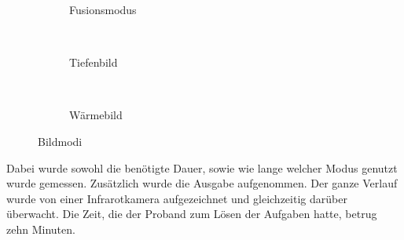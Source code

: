 \begin{figure}[H]
	\begin{subfigure}[t]{0.3\textwidth}
		\centering
		\caption{Fusionsmodus}
		\label{fig:study2_fus0}
	\end{subfigure}
	~
	\begin{subfigure}[t]{0.3\textwidth}
		\centering
		\caption{Tiefenbild}
		\label{fig:study2_depth}
	\end{subfigure}
	~
	\begin{subfigure}[t]{0.3\textwidth}
		\centering
		\caption{Wärmebild}
		\label{fig:study2_ir}
	\end{subfigure}
	\caption{Bildmodi}
	\label{fig:study2_mode}
\end{figure}

Dabei wurde sowohl die benötigte Dauer, sowie wie lange welcher Modus genutzt wurde gemessen.
Zusätzlich wurde die Ausgabe aufgenommen.
Der ganze Verlauf wurde von einer Infrarotkamera aufgezeichnet und gleichzeitig darüber überwacht.
Die Zeit, die der Proband zum Lösen der Aufgaben hatte, betrug zehn Minuten.

